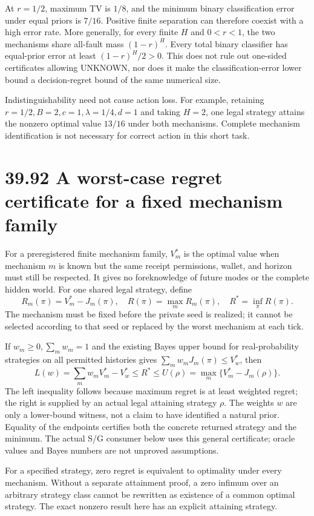 \documentclass[
  english,
  11pt,
  oneside]{book}
\begin{document}
At \(r=1/2\), maximum TV is \(1/8\), and the minimum binary classification error under equal priors is \(7/16\). Positive finite separation can therefore coexist with a high error rate. More generally, for every finite \(H\) and \(0<r<1\), the two mechanisms share all-fault mass \((1-r)^H\). Every total binary classifier has equal-prior error at least \((1-r)^H/2>0\). This does not rule out one-sided certificates allowing UNKNOWN, nor does it make the classification-error lower bound a decision-regret bound of the same numerical size.

Indistinguishability need not cause action loss. For example, retaining \(r=1/2,B=2,c=1,\lambda=1/4,d=1\) and taking \(H=2\), one legal strategy attains the nonzero optimal value \(13/16\) under both mechanisms. Complete mechanism identification is not necessary for correct action in this short task.

\section{39.92 A worst-case regret certificate for a fixed mechanism family}\label{a-worst-case-regret-certificate-for-a-fixed-mechanism-family}

For a preregistered finite mechanism family, \(V_m^*\) is the optimal value when mechanism \(m\) is known but the same receipt permissions, wallet, and horizon must still be respected. It gives no foreknowledge of future modes or the complete hidden world. For one shared legal strategy, define \[R_m(\pi)=V_m^*-J_m(\pi),\quad R(\pi)=\max_mR_m(\pi),\quad R^*=\inf_\pi R(\pi).\] The mechanism must be fixed before the private seed is realized; it cannot be selected according to that seed or replaced by the worst mechanism at each tick.

If \(w_m\ge0,\sum_mw_m=1\) and the existing Bayes upper bound for real-probability strategies on all permitted histories gives \(\sum_mw_mJ_m(\pi)\le V_w^*\), then \[L(w)=\sum_m w_m V_m^*-V_w^*\le R^*\le U(\rho)=\max_m\{V_m^*-J_m(\rho)\}.\] The left inequality follows because maximum regret is at least weighted regret; the right is supplied by an actual legal attaining strategy \(\rho\). The weights \(w\) are only a lower-bound witness, not a claim to have identified a natural prior. Equality of the endpoints certifies both the concrete returned strategy and the minimum. The actual S/G consumer below uses this general certificate; oracle values and Bayes numbers are not unproved assumptions.

For a specified strategy, zero regret is equivalent to optimality under every mechanism. Without a separate attainment proof, a zero infimum over an arbitrary strategy class cannot be rewritten as existence of a common optimal strategy. The exact nonzero result here has an explicit attaining strategy.
\end{document}
